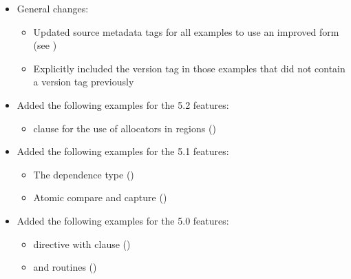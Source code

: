 \begin{itemize}
\item General changes:
\begin{itemize}
\item Updated source metadata tags for all examples to use an improved form
 (see )
\item Explicitly included the version tag  in those 
 examples that did not contain a version tag previously
\end{itemize}

\item Added the following examples for the 5.2 features:
\begin{itemize}
  \item {} clause for the use of allocators in 
   regions ()
\end{itemize}
\item Added the following examples for the 5.1 features:
\begin{itemize}
  \item The  dependence type ()
  \item Atomic compare and capture ()
\end{itemize}
\item Added the following examples for the 5.0 features:
\begin{itemize}
  \item {} directive with 
     clause ()
  \item {} and 
     routines ()
\end{itemize}


\end{itemize}
